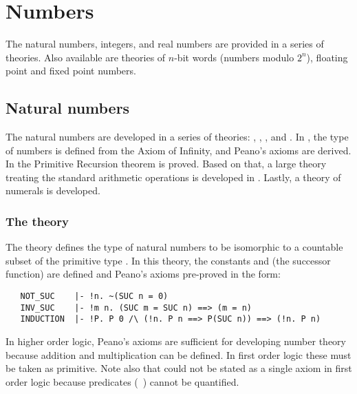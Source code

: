 \section{Numbers}

The natural numbers, integers, and real numbers are provided in a
series of theories. Also available are theories of $n$-bit words
(numbers modulo $2^n$), floating point and fixed point numbers.

\subsection{Natural numbers}

The natural numbers are developed in a series of theories:
, , , and
. In , the type of numbers is
defined from the Axiom of Infinity, and Peano's axioms are derived. In
 the Primitive Recursion theorem is proved. Based
on that, a large theory treating the standard arithmetic operations is
developed in . Lastly, a theory of numerals is
developed.

\subsubsection{The theory }

The theory 
defines the type  of natural numbers to be
isomorphic to a countable subset of the primitive type .  In this
theory, the constants 
and  (the successor function) are defined
and Peano's axioms
pre-proved in the form:

\begin{hol}
\begin{verbatim}
   NOT_SUC    |- !n. ~(SUC n = 0)
   INV_SUC    |- !m n. (SUC m = SUC n) ==> (m = n)
   INDUCTION  |- !P. P 0 /\ (!n. P n ==> P(SUC n)) ==> (!n. P n)
\end{verbatim}
\end{hol}

In higher order logic, Peano's axioms are sufficient for developing number
theory because addition and multiplication can be defined. In first order
logic these must be taken as primitive.  Note also that
could not be stated as a single axiom in first order logic because
predicates (\eg\ ) cannot be quantified.

